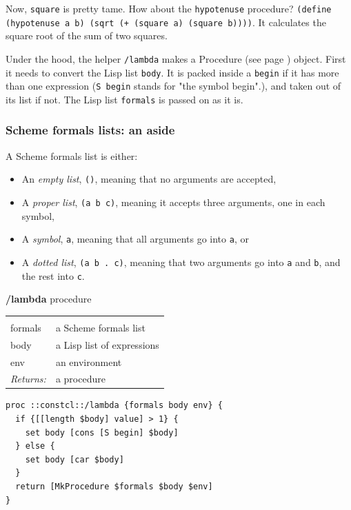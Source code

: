\documentclass[twoside,9pt]{report}
\begin{document}
Now, \texttt{square} is pretty tame. How about the \texttt{hypotenuse} procedure? \texttt{(define (hypotenuse a b) (sqrt (+ (square a) (square b))))}. It calculates the square root of the sum of two squares.


Under the hood, the helper \texttt{/lambda} makes a Procedure (see page \pageref{control}) object. First it needs to convert the Lisp list \texttt{body}. It is packed inside a \texttt{begin} if it has more than one expression (\texttt{S begin} stands for "the symbol begin".), and taken out of its list if not. The Lisp list \texttt{formals} is passed on as it is.

\subsubsection{Scheme formals lists: an aside}
\label{scheme-formals-lists-an-aside}

A Scheme formals list is either:

\begin{itemize}
\item  An \emph{empty list}, \texttt{()}, meaning that no arguments are accepted,
\item  A \emph{proper list}, \texttt{(a b c)}, meaning it accepts three arguments, one in each symbol,
\item  A \emph{symbol}, \texttt{a}, meaning that all arguments go into \texttt{a}, or
\item  A \emph{dotted list}, \texttt{(a b . c)}, meaning that two arguments go into \texttt{a} and \texttt{b}, and the rest into \texttt{c}.
\end{itemize}

\textbf{/lambda} procedure

\noindent\begin{tabular}{ |p{1.5cm} p{8cm}| }
\hline
\rowcolor[HTML]{CCCCCC} \multicolumn{2}{|l|}{\bf /lambda (internal)} \\
formals & a Scheme formals list \\
body & a Lisp list of expressions \\
env & an environment \\
\textit{Returns:} & a procedure \\
\hline
\end{tabular}
\begin{lstlisting}
proc ::constcl::/lambda {formals body env} {
  if {[[length $body] value] > 1} {
    set body [cons [S begin] $body]
  } else {
    set body [car $body]
  }
  return [MkProcedure $formals $body $env]
}
\end{lstlisting}
\end{document}
